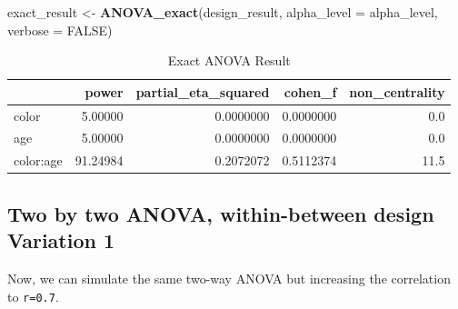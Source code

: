 \documentclass[]{book}
\newenvironment{Shaded}{\begin{snugshade}}{\end{snugshade}}
\newcommand{\DataTypeTok}[1]{\textcolor[rgb]{0.13,0.29,0.53}{#1}}
\newcommand{\KeywordTok}[1]{\textcolor[rgb]{0.13,0.29,0.53}{\textbf{#1}}}
\newcommand{\NormalTok}[1]{#1}
\newcommand{\OtherTok}[1]{\textcolor[rgb]{0.56,0.35,0.01}{#1}}
\newcommand{\StringTok}[1]{\textcolor[rgb]{0.31,0.60,0.02}{#1}}
\begin{document}
\begin{Shaded}
\begin{Highlighting}[]
\NormalTok{exact_result <-}\StringTok{ }\KeywordTok{ANOVA_exact}\NormalTok{(design_result,}
                            \DataTypeTok{alpha_level =}\NormalTok{ alpha_level,}
                            \DataTypeTok{verbose =} \OtherTok{FALSE}\NormalTok{)}
\end{Highlighting}
\end{Shaded}

\begin{table}[!h]

\caption{\label{tab:unnamed-chunk-194}Exact ANOVA Result}
\centering
\begin{tabular}{l|r|r|r|r}
\hline
  & power & partial\_eta\_squared & cohen\_f & non\_centrality\\
\hline
color & 5.00000 & 0.0000000 & 0.0000000 & 0.0\\
\hline
age & 5.00000 & 0.0000000 & 0.0000000 & 0.0\\
\hline
color:age & 91.24984 & 0.2072072 & 0.5112374 & 11.5\\
\hline
\end{tabular}
\end{table}

\hypertarget{two-by-two-anova-within-between-design-variation-1}{%
\subsection{Two by two ANOVA, within-between design Variation 1}\label{two-by-two-anova-within-between-design-variation-1}}

Now, we can simulate the same two-way ANOVA but increasing the correlation to \texttt{r\textasciigrave{}\textasciigrave{}=0.7}.
\end{document}
